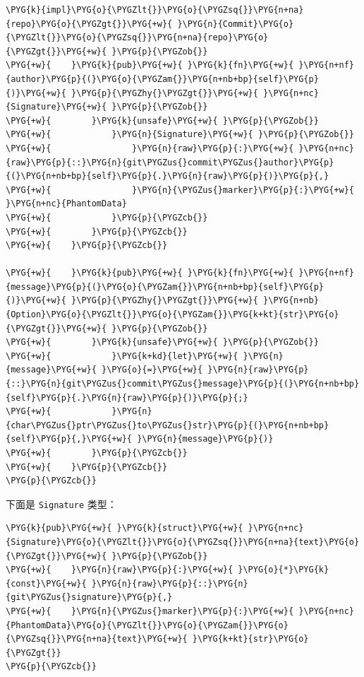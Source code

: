 \begin{Verbatim}[commandchars=\\\{\},breaklines=true,breakanywhere=true,fontsize=\codefont,xleftmargin=17bp]
\PYG{k}{impl}\PYG{o}{\PYGZlt{}}\PYG{o}{\PYGZsq{}}\PYG{n+na}{repo}\PYG{o}{\PYGZgt{}}\PYG{+w}{ }\PYG{n}{Commit}\PYG{o}{\PYGZlt{}}\PYG{o}{\PYGZsq{}}\PYG{n+na}{repo}\PYG{o}{\PYGZgt{}}\PYG{+w}{ }\PYG{p}{\PYGZob{}}
\PYG{+w}{    }\PYG{k}{pub}\PYG{+w}{ }\PYG{k}{fn}\PYG{+w}{ }\PYG{n+nf}{author}\PYG{p}{(}\PYG{o}{\PYGZam{}}\PYG{n+nb+bp}{self}\PYG{p}{)}\PYG{+w}{ }\PYG{p}{\PYGZhy{}\PYGZgt{}}\PYG{+w}{ }\PYG{n+nc}{Signature}\PYG{+w}{ }\PYG{p}{\PYGZob{}}
\PYG{+w}{        }\PYG{k}{unsafe}\PYG{+w}{ }\PYG{p}{\PYGZob{}}
\PYG{+w}{            }\PYG{n}{Signature}\PYG{+w}{ }\PYG{p}{\PYGZob{}}
\PYG{+w}{                }\PYG{n}{raw}\PYG{p}{:}\PYG{+w}{ }\PYG{n+nc}{raw}\PYG{p}{::}\PYG{n}{git\PYGZus{}commit\PYGZus{}author}\PYG{p}{(}\PYG{n+nb+bp}{self}\PYG{p}{.}\PYG{n}{raw}\PYG{p}{)}\PYG{p}{,}
\PYG{+w}{                }\PYG{n}{\PYGZus{}marker}\PYG{p}{:}\PYG{+w}{ }\PYG{n+nc}{PhantomData}
\PYG{+w}{            }\PYG{p}{\PYGZcb{}}
\PYG{+w}{        }\PYG{p}{\PYGZcb{}}
\PYG{+w}{    }\PYG{p}{\PYGZcb{}}

\PYG{+w}{    }\PYG{k}{pub}\PYG{+w}{ }\PYG{k}{fn}\PYG{+w}{ }\PYG{n+nf}{message}\PYG{p}{(}\PYG{o}{\PYGZam{}}\PYG{n+nb+bp}{self}\PYG{p}{)}\PYG{+w}{ }\PYG{p}{\PYGZhy{}\PYGZgt{}}\PYG{+w}{ }\PYG{n+nb}{Option}\PYG{o}{\PYGZlt{}}\PYG{o}{\PYGZam{}}\PYG{k+kt}{str}\PYG{o}{\PYGZgt{}}\PYG{+w}{ }\PYG{p}{\PYGZob{}}
\PYG{+w}{        }\PYG{k}{unsafe}\PYG{+w}{ }\PYG{p}{\PYGZob{}}
\PYG{+w}{            }\PYG{k+kd}{let}\PYG{+w}{ }\PYG{n}{message}\PYG{+w}{ }\PYG{o}{=}\PYG{+w}{ }\PYG{n}{raw}\PYG{p}{::}\PYG{n}{git\PYGZus{}commit\PYGZus{}message}\PYG{p}{(}\PYG{n+nb+bp}{self}\PYG{p}{.}\PYG{n}{raw}\PYG{p}{)}\PYG{p}{;}
\PYG{+w}{            }\PYG{n}{char\PYGZus{}ptr\PYGZus{}to\PYGZus{}str}\PYG{p}{(}\PYG{n+nb+bp}{self}\PYG{p}{,}\PYG{+w}{ }\PYG{n}{message}\PYG{p}{)}
\PYG{+w}{        }\PYG{p}{\PYGZcb{}}
\PYG{+w}{    }\PYG{p}{\PYGZcb{}}
\PYG{p}{\PYGZcb{}}
\end{Verbatim}

下面是 \texttt{Signature} 类型：

\begin{Verbatim}[commandchars=\\\{\},breaklines=true,breakanywhere=true,fontsize=\codefont,xleftmargin=17bp]
\PYG{k}{pub}\PYG{+w}{ }\PYG{k}{struct}\PYG{+w}{ }\PYG{n+nc}{Signature}\PYG{o}{\PYGZlt{}}\PYG{o}{\PYGZsq{}}\PYG{n+na}{text}\PYG{o}{\PYGZgt{}}\PYG{+w}{ }\PYG{p}{\PYGZob{}}
\PYG{+w}{    }\PYG{n}{raw}\PYG{p}{:}\PYG{+w}{ }\PYG{o}{*}\PYG{k}{const}\PYG{+w}{ }\PYG{n}{raw}\PYG{p}{::}\PYG{n}{git\PYGZus{}signature}\PYG{p}{,}
\PYG{+w}{    }\PYG{n}{\PYGZus{}marker}\PYG{p}{:}\PYG{+w}{ }\PYG{n+nc}{PhantomData}\PYG{o}{\PYGZlt{}}\PYG{o}{\PYGZam{}}\PYG{o}{\PYGZsq{}}\PYG{n+na}{text}\PYG{+w}{ }\PYG{k+kt}{str}\PYG{o}{\PYGZgt{}}
\PYG{p}{\PYGZcb{}}
\end{Verbatim}

